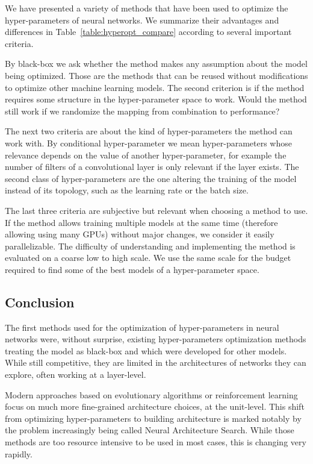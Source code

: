 We have presented a variety of methods that have been used to optimize the hyper-parameters of neural networks. We summarize their advantages and differences in Table~\ref{table:hyperopt_compare} according to several important criteria.

By black-box we ask whether the method makes any assumption about the model being optimized. Those are the methods that can be reused without modifications to optimize other machine learning models. The second criterion is if the method requires some structure in the hyper-parameter space to work. Would the method still work if we randomize the mapping from combination to performance? 

The next two criteria are about the kind of hyper-parameters the method can work with. By conditional hyper-parameter we mean hyper-parameters whose relevance depends on the value of another hyper-parameter, for example the number of filters of a convolutional layer is only relevant if the layer exists. The second class of hyper-parameters are the one altering the training of the model instead of its topology, such as the learning rate or the batch size. 

The last three criteria are subjective but relevant when choosing a method to use. If the method allows training multiple models at the same time (therefore allowing using many GPUs) without major changes, we consider it easily parallelizable. The difficulty of understanding and implementing the method is evaluated on a coarse low to high scale. We use the same scale for the budget required to find some of the best models of a hyper-parameter space.

\subsection{Conclusion}

The first methods used for the optimization of hyper-parameters in neural networks were, without surprise, existing hyper-parameters optimization methods treating the model as black-box and which were developed for other models. While still competitive, they are limited in the architectures of networks they can explore, often working at a layer-level. 

Modern approaches based on evolutionary algorithms or reinforcement learning focus on much more fine-grained architecture choices, at the unit-level. This shift from optimizing hyper-parameters to building architecture is marked notably by the problem increasingly being called Neural Architecture Search. While those methods are too resource intensive to be used in most cases, this is changing very rapidly. 


